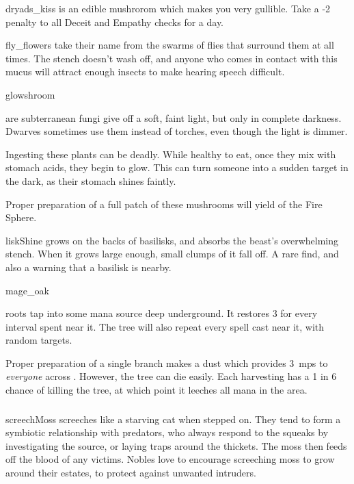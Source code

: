 \begin{multicols}{2}
%
  {dryads_kiss}%
  {is an edible mushrorom which makes you very gullible.
  Take a -2 penalty to all Deceit and Empathy checks for a day.}%

%
  {fly_flowers}%
  {take their name from the swarms of flies that surround them at all times.
  The stench doesn't wash off, and anyone who comes in contact with this mucus will attract enough insects to make hearing speech difficult.}%

%
  {glowshroom}%
  {are subterranean fungi give off a soft, faint light, but only in complete darkness.
   Dwarves sometimes use them instead of torches, even though the light is dimmer.

   Ingesting these plants can be deadly.
   While healthy to eat, once they mix with stomach acids, they begin to glow.
   This can turn someone into a sudden target in the dark, as their stomach shines faintly.

   Proper preparation of a full patch of these mushrooms will yield  of the Fire Sphere.
    }

%
  {liskShine}%
  {grows on the backs of \glspl{basilisk}, and absorbs the beast's overwhelming stench.
  When it grows large enough, small clumps of it fall off.
  A rare find, and also a warning that a basilisk is nearby.
    }

%
  {mage_oak}%
  {roots tap into some mana source deep underground.
    It restores 3  for every \gls{interval} spent near it.
    The tree will also repeat every spell cast near it, with random targets.

    Proper preparation of a single branch makes a dust which provides 3~\glspl{mp} to \emph{everyone} across .
    However, the tree can die easily.
    Each harvesting has a 1 in 6 chance of killing the tree, at which point it leeches all mana in the \gls{area}.
  }%

\subsubsection{}

%
  {screechMoss}%
  {screeches like a starving cat when stepped on.
  They tend to form a symbiotic relationship with predators, who always respond to the squeaks by investigating the source, or laying traps around the thickets.
  The moss then feeds off the blood of any victims.
  Nobles love to encourage screeching moss to grow around their estates, to protect against unwanted intruders.
    }


\end{multicols}
